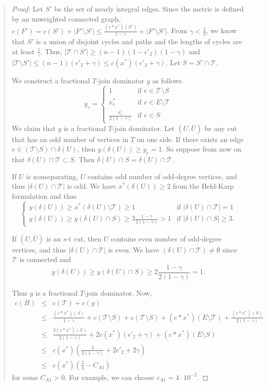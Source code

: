 \documentclass[11pt,letterpaper]{article}
\newcommand{\st}{\mbox{$s$-$t$} }
\begin{document}
\begin{quote}
\begin{proof}
Let $S'$ be the set of nearly integral edges. Since the metric is defined by an unweighted connected graph, $c(F')=c(S')+|F'\setminus S'|\leq\frac{(c\ast x^*)(S')}{1-\gamma}+|F'\setminus S'|$. From $\gamma<\frac{1}{3}$, we know that $S'$ is a union of disjoint cycles and paths and the lengths of cycles are at least $\frac{1}{\gamma}$. Thus, $|\mathscr{T}\cap S'|\geq (n-1)(1-\epsilon'_2)(1-\gamma)$ and $|\mathscr{T}\setminus S'|\leq (n-1)(\epsilon'_2+\gamma)\leq c(x^*)(\epsilon'_2+\gamma)$. Let $S=S'\cap \mathscr{T}$.

We construct a fractional $T$-join dominator $y$ as follows.\[
y_e = \begin{cases}
1&\textrm{if }e\in \mathscr{T}\setminus S\\
x_e^*&\textrm{if }e\in E\setminus \mathscr{T}\\
\frac{x_e^*}{2(1-\gamma)}&\textrm{if }e\in S
\end{cases}
\]We claim that $y$ is a fractional $T$-join dominator. Let $(U,\bar U)$ be any cut that has an odd number of vertices in $T$ on one side. If there exists an edge $e\in (\mathscr{T}\setminus S)\cap \delta(U)$, then $y(\delta(U))\geq y_e = 1$. So suppose from now on that $\delta(U)\cap \mathscr{T}\subset S$. Then $\delta(U)\cap S=\delta(U)\cap \mathscr{T}$.

If $U$ is nonseparating, $U$ contains odd number of odd-degree vertices, and thus $|\delta(U)\cap \mathscr{T}|$ is odd. We have $x^*(\delta(U))\geq 2$ from the Held-Karp formulation and thus\[
\begin{cases}
y(\delta(U))\geq x^*(\delta(U)\setminus \mathscr{T})\geq 1&\textrm{if }|\delta(U)\cap \mathscr{T}|=1\\
y(\delta(U))\geq y(\delta(U)\cap S)\geq 3\frac{1-\gamma}{2(1-\gamma)} > 1&\textrm{if }|\delta(U)\cap S|\geq 3
.\end{cases}
\]

If $(U,\bar U)$ is an \st cut, then $U$ contains even number of odd-degree vertices, and thus $|\delta(U)\cap \mathscr{T}|$ is even. We have $(\delta(U)\cap \mathscr{T})\neq\emptyset$ since $\mathscr{T}$ is connected and\[
y(\delta(U))\geq y(\delta(U)\cap S)\geq 2\frac{1-\gamma}{2(1-\gamma)}=1
.\]

Thus $y$ is a fractional $T$-join dominator. Now,\begin{eqnarray*}
c(H)&\leq&c(\mathscr{T})+c(y)\\
&\leq&\frac{(c\ast x^*)(S)}{1-\gamma}+c(\mathscr{T}\setminus S)+c(\mathscr{T}\setminus S)+(c\ast x^*)(E\setminus \mathscr{T})+\frac{(c\ast x^*)(S)}{2(1-\gamma)}\\
&\leq&\frac{3(c\ast x^*)(S)}{2(1-\gamma)}+2c(x^*)(\epsilon'_2+\gamma)+(c\ast x^*)(E\setminus S)\\
&\leq&c(x^*)(\frac{3}{2(1-\gamma)}+2\epsilon'_2+2\gamma)\\
&\leq&c(x^*)(\frac{5}{3}-C_{A1})
\end{eqnarray*}for some $C_{A1}>0$. For example, we can choose $c_{A1}=4\cdot 10^{-2}$.
\end{proof}


\end{quote}
\end{document}

